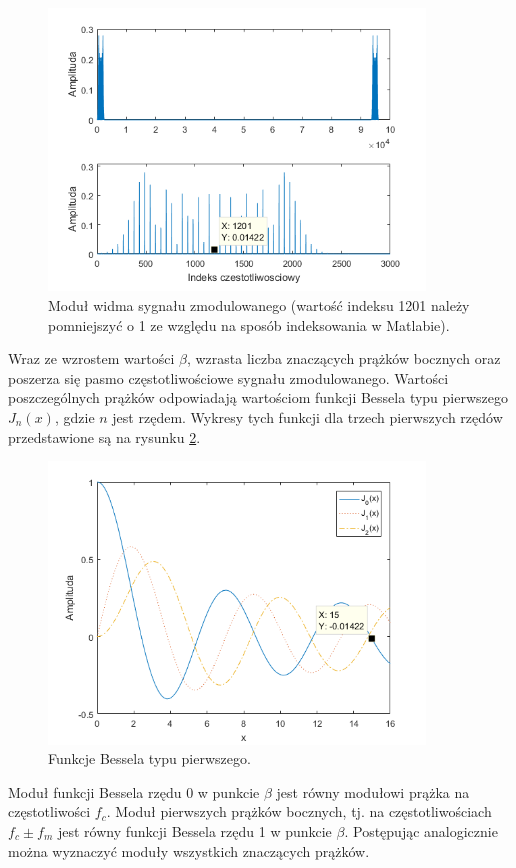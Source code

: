\begin{figure}[H]
	\centering
	\includegraphics[width=10cm]{grafiki/fm_widmo}
	\captionsetup{justification=centering}
	\caption{Moduł widma sygnału zmodulowanego (wartość indeksu 1201 należy pomniejszyć o 1 ze względu na sposób indeksowania w Matlabie).}
	\label{rys:fm_widmo}
\end{figure}
Wraz ze wzrostem wartości $\beta$, wzrasta liczba znaczących prążków bocznych oraz poszerza się pasmo częstotliwościowe sygnału zmodulowanego.
Wartości poszczególnych prążków odpowiadają wartościom funkcji Bessela typu pierwszego $J_n(x)$, gdzie $n$ jest rzędem. Wykresy tych funkcji dla trzech pierwszych rzędów przedstawione są na rysunku \ref{rys:fm_bessel}.
\begin{figure}[H]
	\centering
	\includegraphics[width=10cm]{grafiki/fm_bessel}
	\captionsetup{justification=centering}
	\caption{Funkcje Bessela typu pierwszego.}
	\label{rys:fm_bessel}
\end{figure}

Moduł funkcji Bessela rzędu 0 w punkcie $\beta$ jest równy modułowi prążka na częstotliwości $f_c$. Moduł pierwszych prążków bocznych, tj. na częstotliwościach $f_c \pm f_m$ jest równy funkcji Bessela rzędu 1 w punkcie $\beta$. Postępując analogicznie można wyznaczyć moduły wszystkich znaczących prążków.

